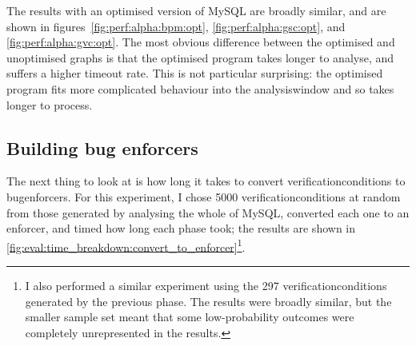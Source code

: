 \begin{sanefig}
  \caption{Effect of the $\alpha$ parameter on the number of
    \gls{interferingthread} \glspl{cfg} per \gls{crashingthread}
        {\StateMachine} for an optimised build of MySQL.  }
  \label{fig:perf:alpha:gsc:opt}
\end{sanefig}

\begin{sanefig}
  \caption{Effect of the $\alpha$ parameter on the number of
    \glspl{verificationcondition} generated and the time taken to do
    so for an optimised build of MySQL.}
  \label{fig:perf:alpha:gvc:opt}
\end{sanefig}

The results with an optimised version of MySQL are broadly similar,
and are shown in figures~\ref{fig:perf:alpha:bpm:opt},
\ref{fig:perf:alpha:gsc:opt}, and \ref{fig:perf:alpha:gvc:opt}.  The
most obvious difference between the optimised and unoptimised graphs
is that the optimised program takes longer to analyse, and suffers a
higher timeout rate.  This is not particular surprising: the optimised
program fits more complicated behaviour into the \gls{analysiswindow}
and so takes longer to process.  

\subsection{Building bug enforcers}

The next thing to look at is how long it takes to convert
\glspl{verificationcondition} to \glspl{bugenforcer}.  For this
experiment, I chose 5000 \glspl{verificationcondition} at random from
those generated by analysing the whole of MySQL, converted each one to
an enforcer, and timed how long each phase took; the results are shown
in \autoref{fig:eval:time_breakdown:convert_to_enforcer}\footnote{I
  also performed a similar experiment using the 297
  \glspl{verificationcondition} generated by the previous phase.  The
  results were broadly similar, but the smaller sample set meant that
  some low-probability outcomes were completely unrepresented in the
  results.}.

